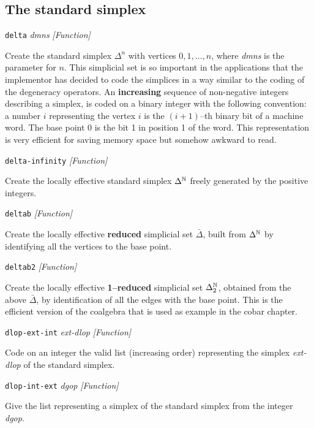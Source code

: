 \subsection {The standard simplex}
{\parindent=0mm
{\leftskip=5mm 
{\tt delta} {\em dmns} \hfill {\em [Function]} \par}
{\leftskip=15mm 
Create the standard simplex $\Delta^n$ with vertices $0,1,\ldots,n$,  
where {\em dmns} is the parameter for $n$.
This simplicial set is so important in the applications that
the implementor has decided to code the simplices in a  way similar to the coding 
of the degeneracy operators.
An {\bf increasing} sequence of non-negative integers describing a simplex, is coded
on a binary integer with the following convention: a number $i$ representing the vertex $i$ 
is the $(i+1)$--th binary bit of a machine word. The base point $0$ is the bit 1 in position 1 of the
word. This representation is very efficient for saving memory space but somehow awkward to read. \par}
{\leftskip=5mm 
{\tt delta-infinity} \hfill {\em [Function]} \par}
{\leftskip=15mm 
Create the locally effective standard simplex $\Delta^{{\Bbb N}}$ freely generated by the positive integers. \par}
{\leftskip=5mm 
{\tt deltab} \hfill {\em [Function]} \par}
{\leftskip=15mm 
Create the locally effective {\bf reduced} simplicial set $\bar \Delta$, built from
$\Delta^{{\Bbb N}}$ by identifying all the vertices to the base point. \par}
{\leftskip=5mm 
{\tt deltab2} \hfill {\em [Function]} \par}
{\leftskip=15mm 
Create the locally effective {\bf 1--reduced} simplicial set $\Delta_2^{{\Bbb N}}$, obtained from the above $\bar \Delta$,
by identification of all the edges with the base point. This is the efficient version of the coalgebra 
that is used as example in the cobar chapter. \par}
{\leftskip=5mm 
{\tt dlop-ext-int} {\em ext-dlop} \hfill {\em [Function]}\par}
{\leftskip=15mm 
Code on an integer the valid list (increasing order) representing the simplex {\em ext-dlop} of the
standard simplex. \par}
{\leftskip=5mm 
{\tt dlop-int-ext} {\em dgop} \hfill {\em [Function]}\par}
{\leftskip=15mm 
Give the list representing a simplex of the standard simplex from the integer {\em dgop}. \par}
}
